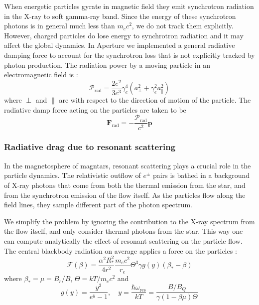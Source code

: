 When energetic particles gyrate in magnetic field they emit synchrotron
radiation in the X-ray to soft gamma-ray band. Since the energy of these
synchrotron photons is in general much less than $m_{e}c^{2}$, we do not track
them explicitly. However, charged particles do lose energy to synchrotron
radiation and it may affect the global dynamics. In Aperture we implemented a
general radiative damping force to account for the synchrotron loss that is not
explicitly tracked by photon production. The radiation power by a moving
particle in an electromagnetic field is \citep[e.g.][]{cerutti_extreme_2012}:
\begin{equation}
  \label{eq:rad-power}
  \mathcal{P}_\mathrm{rad} = \frac{2e^2}{3c^3}\gamma_{e}^{4}(a_{\perp}^2+\gamma_{e}^2a_{\parallel}^2)
\end{equation}
where $\perp$ and $\parallel$ are with respect to the direction of motion of the
particle. The radiative damp force acting on the particles are taken to be
\begin{equation}
  \label{eq:rad-force}
  \mathbf{F}_\mathrm{rad} = -\frac{\mathcal{P}_\mathrm{rad}}{c^2}\mathbf{p}
\end{equation}


\subsubsection{Radiative drag due to resonant scattering}
\label{sec:resonant-scattering}

In the magnetosphere of magntars, resonant scattering plays a crucial role in
the particle dynamics. The
relativistic outflow of $e^{\pm}$ pairs is bathed in a background of X-ray
photons that come from both the thermal emission from the star, and from the
synchrotron emission of the flow itself. As the particles flow along the field
lines, they sample different part of the photon spectrum.

We simplify the problem by ignoring the contribution to the X-ray spectrum from
the flow itself, and only consider thermal photons from the star. This way one
can compute analytically the effect of resonant scattering on the particle flow.
The central blackbody radiation on average applies a force on the particles
\citep{beloborodov_electron-positron_2012}:
\begin{equation}
  \label{eq:resonant-drag}
  \mathcal{F}(\beta) = \frac{\alpha^2R_{*}^2}{4r^2}\frac{m_{e}c^2}{r_{e}}\Theta^3\gamma g(y)(\beta_{*}-\beta)
\end{equation}
where $\beta_{*} = \mu = B_r/B$, $\Theta = kT/m_{e}c^2$ and
\begin{equation}
  \label{eq:y-and-gy}
  g(y) = \frac{y^3}{e^y - 1},\quad y = \frac{\hbar\omega_\mathrm{res}}{kT} = \frac{B/B_Q}{\gamma(1 - \beta\mu)\Theta}
\end{equation}

